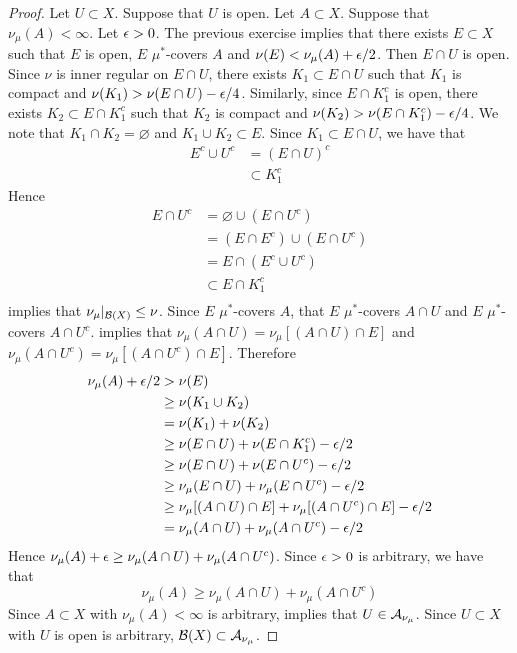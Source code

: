 \documentclass{book}
\begin{document}
	\begin{proof}
		Let $U \subset X$. Suppose that $U$ is open. Let $A \subset X$. Suppose that $\nu_{\mu}(A) < \infty$. Let $\epsilon > 0$. The previous exercise implies that there exists $E \subset X$ such that $E$ is open, $E$ $\mu^*$-covers $A$ and $\nu(E) < \nu_{\mu}(A) + \epsilon/2$. Then $E \cap U$ is open. Since $\nu$ is inner regular on $E \cap U$, there exists $K_1 \subset E \cap U$ such that $K_1$ is compact and $\nu(K_1) > \nu(E \cap U) - \epsilon / 4$. Similarly, since $E \cap K_1^c$ is open, there exists $K_2 \subset E \cap K_1^c$ such that $K_2$ is compact and $\nu(K_2) > \nu(E \cap K_1^c) - \epsilon /4$. We note that $K_1 \cap K_2 = \varnothing$ and $K_1 \cup K_2 \subset E$. Since $K_1 \subset E \cap U$, we have that  
		\begin{align*}
			E^c \cup U^c
			& = (E \cap U)^c \\
			& \subset K_1^c
		\end{align*}
		Hence 
		\begin{align*}
			E \cap U^c
			& = \varnothing \cup (E \cap U^c ) \\
			& = (E \cap E^c) \cup (E \cap U^c ) \\
			& = E \cap (E^c \cup U^c) \\
			& \subset E \cap K_1^c \\
		\end{align*}
		 implies that $\nu_{\mu}|_{\mathcal{B}(X)} \leq \nu$. Since $E$ $\mu^*$-covers $A$,  that $E$ $\mu^*$-covers $A \cap U$ and $E$ $\mu^*$-covers $A \cap U^c$.  implies that $\nu_{\mu}(A\cap U) = \nu_{\mu}[(A \cap U) \cap E]$ and $\nu_{\mu}(A\cap U^c) = \nu_{\mu}[(A \cap U^c) \cap E]$. Therefore
		\begin{align*}
			\nu_{\mu}(A) + \epsilon /2 
			& > \nu(E) \\
			& \geq \nu(K_1 \cup K_2) \\
			& = \nu(K_1) + \nu(K_2) \\
			& \geq \nu(E \cap U) + \nu(E \cap K_1^c) - \epsilon/2 \\
			& \geq \nu(E \cap U) + \nu(E \cap U^c) - \epsilon/2 \\
			& \geq \nu_{\mu}(E \cap U) + \nu_{\mu}(E \cap U^c) - \epsilon /2 \\
			& \geq \nu_{\mu}[(A \cap U) \cap E] + \nu_{\mu}[(A \cap U^c) \cap E] - \epsilon /2 \\
			& = \nu_{\mu}(A \cap U) + \nu_{\mu}(A \cap U^c) - \epsilon /2 \\
		\end{align*}
		Hence $\nu_{\mu}(A) + \epsilon \geq \nu_{\mu}(A \cap U) + \nu_{\mu}(A \cap U^c)$. Since $\epsilon > 0$ is arbitrary, we have that
		$$\nu_{\mu}(A) \geq \nu_{\mu}(A \cap U) + \nu_{\mu}(A \cap U^c)$$
		Since $A \subset X$ with $\nu_{\mu}(A) < \infty$ is arbitrary,  implies that $U \in \mathcal{A}_{\nu_{\mu}}$. Since $U \subset X$ with $U$ is open is arbitrary, $\mathcal{B}(X) \subset \mathcal{A}_{\nu_{\mu}}$. 
	\end{proof}
\end{document}
